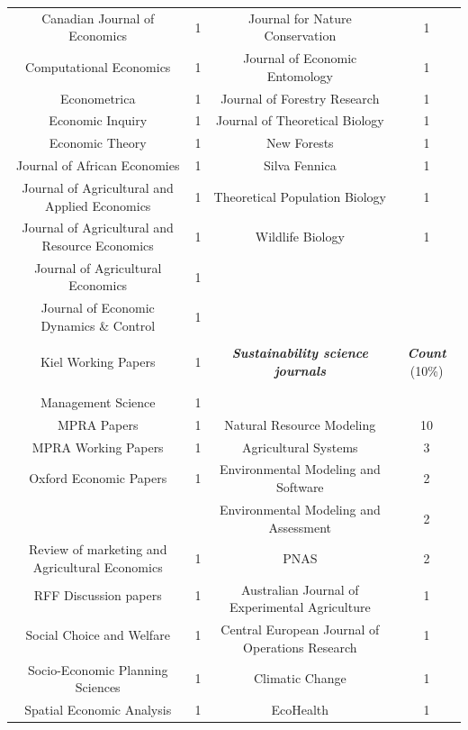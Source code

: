 \begin{table}[H]
{\begin{tabular}{@{\extracolsep{1pt}} cccc}
Canadian Journal of Economics & 1 & Journal for Nature Conservation & 1 \\ 
Computational Economics & 1 & Journal of Economic Entomology & 1 \\ 
Econometrica & 1 & Journal of Forestry Research & 1 \\ 
Economic Inquiry & 1 & Journal of Theoretical Biology & 1 \\ 
Economic Theory & 1 & New Forests & 1 \\ 
Journal of African Economies & 1 & Silva Fennica & 1 \\ 
Journal of Agricultural and Applied Economics & 1 & Theoretical Population Biology & 1 \\ 
Journal of Agricultural and Resource Economics & 1 & Wildlife Biology & 1 \\ 
Journal of Agricultural Economics & 1 &  &  \\ 
Journal of Economic Dynamics \& Control & 1 &  &  \\ 
\cline{3-4} \noalign{\vskip\doublerulesep
         \vskip-\arrayrulewidth} \cline{3-4}\\[-1.8ex] 
Kiel Working Papers & 1 & \textbf{\textit{Sustainability science journals}} & \textbf{\textit{Count}} (10\%) \\ 
\\[-1.8ex]  \cline{3-4} \noalign{\vskip\doublerulesep
         \vskip-\arrayrulewidth} \cline{3-4}\\[-1.8ex]
Management Science & 1 &  &  \\ 
MPRA Papers & 1 & Natural Resource Modeling & 10 \\ 
MPRA Working Papers & 1 & Agricultural Systems & 3 \\ 
Oxford Economic Papers & 1 & Environmental Modeling and Software & 2 \\ 
& &  Environmental Modeling and Assessment & 2\\
Review of marketing and Agricultural Economics & 1 & PNAS & 2 \\ 
RFF Discussion papers & 1 & \multirow{2}{20em}{Australian Journal of Experimental Agriculture} & 1 \\ 
& & & \\
Social Choice and Welfare & 1 & \multirow{2}{20em}{Central European Journal of Operations Research} & 1 \\ 
& & & \\
Socio-Economic Planning Sciences & 1 & Climatic Change & 1 \\ 
Spatial Economic Analysis & 1 & EcoHealth & 1 \\ 

\end{tabular}}
\end{table}
